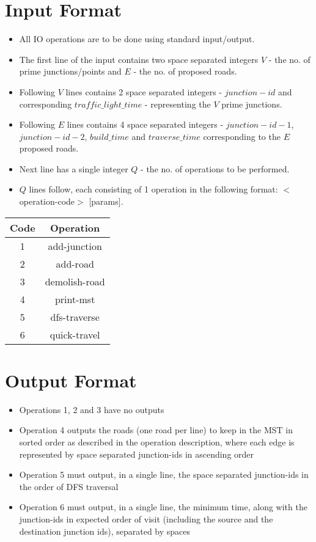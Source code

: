 \documentclass[20pt]{article}
\begin{document}
\section{Input Format}
\begin{itemize}
\item All IO operations are to be done using standard input/output.
\item The first line of the input contains two space separated integers $V$ - the no. of prime junctions/points and $E$ - the no. of proposed roads.
\item Following $V$ lines contains 2 space separated integers - $junction-id$ and corresponding $traffic\_light\_time$ - representing the $V$ prime junctions.
\item Following $E$ lines contains 4 space separated integers - $junction-id-1$, $junction-id-2$, $build\_time$  and $traverse\_time$  corresponding to the $E$ proposed roads.
\item Next line has a single integer $Q$ - the no. of operations to be performed.
\item $Q$ lines follow, each consisting of 1 operation in the following format: $<$operation-code$>$ $[$params$]$.
\end{itemize}

\begin{center}
\begin{tabular}{|c|c|}
\hline 
\textbf{Code} & \textbf{Operation} \\
\hline 
1 & add-junction \\ 
\hline 
2 & add-road \\ 
\hline 
3 & demolish-road \\ 
\hline 
4 & print-mst \\ 
\hline 
5 & dfs-traverse \\ 
\hline 
6 & quick-travel \\ 
\hline 
\end{tabular} 
\end{center}
\section{Output Format}
\begin{itemize}
\item Operations 1, 2 and 3 have no outputs
\item Operation 4 outputs the roads (one road per line) to keep in the MST in sorted order as described in the operation description, where each edge is represented by space separated junction-ids in ascending order
\item Operation 5 must output, in a single line, the space separated junction-ids in the order of DFS traversal
\item Operation 6 must output, in a single line, the minimum time, along with the junction-ids in expected order of visit (including the source and the destination junction ids), separated by spaces
\end{itemize}
\end{document}
